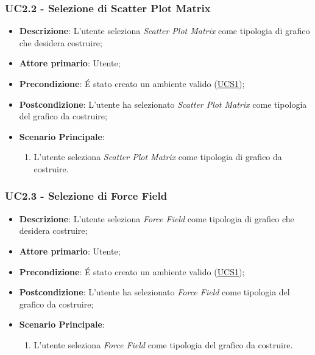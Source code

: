 \subsubsection{UC2.2 - Selezione di Scatter Plot Matrix}
\label{ssub:uc2.2}
\begin{itemize}

	\item \textbf{Descrizione}: L’utente seleziona \emph{Scatter Plot Matrix} come tipologia di grafico che desidera 
	costruire;

    \item \textbf{Attore primario}: Utente;

	\item \textbf{Precondizione}:   É stato creato un ambiente valido (\hyperref[sub:uc1]{UCS1});

	\item \textbf{Postcondizione}:  L'utente ha selezionato \emph{Scatter Plot Matrix} come tipologia del grafico da 
	costruire;

	\item \textbf{Scenario Principale}:
	\begin{enumerate}
		\item L'utente seleziona \emph{Scatter Plot Matrix} come tipologia di grafico da costruire.
	\end{enumerate}
\end{itemize}


\subsubsection{UC2.3 - Selezione di Force Field}
\label{ssub:uc2.3}
\begin{itemize}

	\item \textbf{Descrizione}: L’utente seleziona \emph{Force Field} come tipologia di grafico che desidera 
	costruire;

    \item \textbf{Attore primario}: Utente;

    \item \textbf{Precondizione}:   É stato creato un ambiente valido (\hyperref[sub:uc1]{UCS1});

    \item \textbf{Postcondizione}:  L'utente ha selezionato \emph{Force Field} come tipologia del grafico da 
	costruire;
	
	\item \textbf{Scenario Principale}: 
	\begin{enumerate}
		\item L'utente seleziona \emph{Force Field} come tipologia del grafico da costruire.
	\end{enumerate}

\end{itemize}


